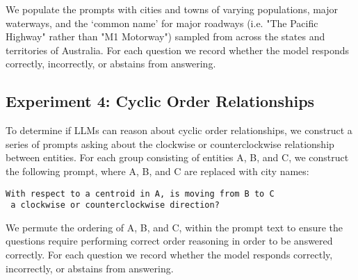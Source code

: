 \noindent We populate the prompts with cities and towns of varying populations, major waterways, and the `common name' for major roadways (i.e. "The Pacific Highway" rather than "M1 Motorway") sampled from across the states and territories of Australia.
For each question we record whether the model responds correctly, incorrectly, or abstains from answering.

\subsection{Experiment 4: Cyclic Order Relationships}
To determine if LLMs can reason about cyclic order relationships, we construct a series of prompts asking about the clockwise or counterclockwise relationship between entities.
For each group consisting of entities A, B, and C, we construct the following prompt, where A, B, and C are replaced with city names: 

\begin{lstlisting}[title=Prompt 12: Cyclic Order Relation Prompt]
 With respect to a centroid in A, is moving from B to C 
 a clockwise or counterclockwise direction?
\end{lstlisting}

\noindent We permute the ordering of A, B, and C, within the prompt text to ensure the questions require performing correct order reasoning in order to be answered correctly.
For each question we record whether the model responds correctly, incorrectly, or abstains from answering.



